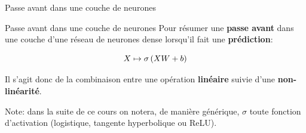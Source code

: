 \begin{frame}{Passe avant dans une couche de neurones}
	
	\begin{block}{Passe avant dans une couche de neurones}
		Pour résumer une \textbf{passe avant} dans une couche d'une réseau de neurones dense lorsqu'il fait une \textbf{prédiction}:
		
		\begin{equation*}
			X \mapsto \operatorname{\sigma}\left(X W + b\right)
		\end{equation*} 
		
		Il s'agit donc de la combinaison entre une opération \textbf{linéaire} suivie d'une \textbf{non-linéarité}.		
	\end{block}
	
	\vspace{0.3cm}
	
	Note: dans la suite de ce cours on notera, de manière générique, $\sigma$ toute fonction d'activation (logistique, tangente hyperbolique ou ReLU).

\end{frame}
